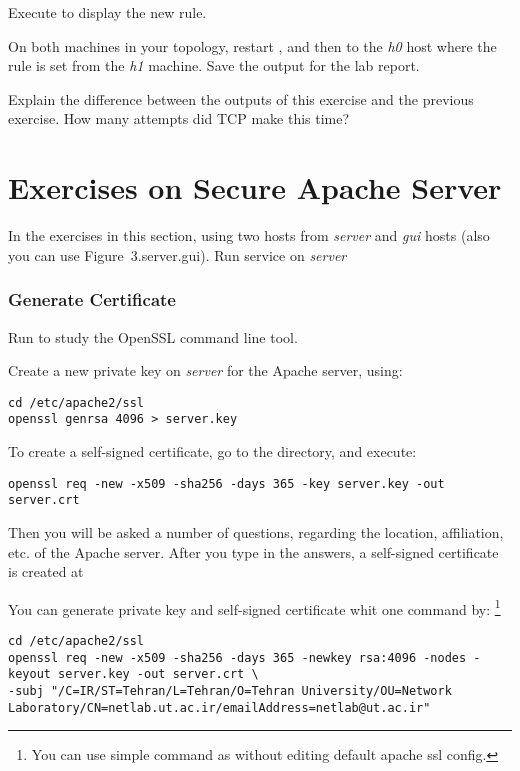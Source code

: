 \documentclass{../UTNetLab}
\begin{document}
    Execute  to display the new rule.

    On both machines in your topology, restart , and then  to the \textit{h0} host where the rule is set from the \textit{h1} machine.
    Save the  output for the lab report.
    
    \begin{report}
        \item Explain the difference between the  outputs of this exercise and the previous exercise.
            How many attempts did {TCP} make this time?
    \end{report}

\part{Exercises on Secure Apache Server}
    In the exercises in this section, using two hosts from \textit{server} and \textit{gui} hosts (also you can use {Figure~3.server.gui}).
    Run  service on \textit{server}

\section{Generate Certificate}
    Run  to study the OpenSSL command line tool.

    Create a new private key on \textit{server} for the Apache server, using:
    \begin{lstlisting}[emph={server,key},morekeywords={[2]genrsa}]
cd /etc/apache2/ssl
openssl genrsa 4096 > server.key
    \end{lstlisting}
    To create a self-signed certificate, go to the  directory, and execute:
    \begin{lstlisting}[emph={server,key,crt},morekeywords={[2]req}]
openssl req -new -x509 -sha256 -days 365 -key server.key -out server.crt
    \end{lstlisting}
    Then you will be asked a number of questions, regarding the location, affiliation, etc.
    of the Apache server.
    After you type in the answers, a self-signed certificate is created at 

    You can generate private key and self-signed certificate whit one command by:
    \footnote{You can use simple command as  without editing default apache ssl config.}
    \begin{lstlisting}[emph={server,key,crt},morekeywords={[2]req},escapechar={}]
cd /etc/apache2/ssl
openssl req -new -x509 -sha256 -days 365 -newkey rsa:4096 -nodes -keyout server.key -out server.crt \
-subj "/C=IR/ST=Tehran/L=Tehran/O=Tehran University/OU=Network Laboratory/CN=netlab.ut.ac.ir/emailAddress=netlab@ut.ac.ir"
    \end{lstlisting}
\end{document}
